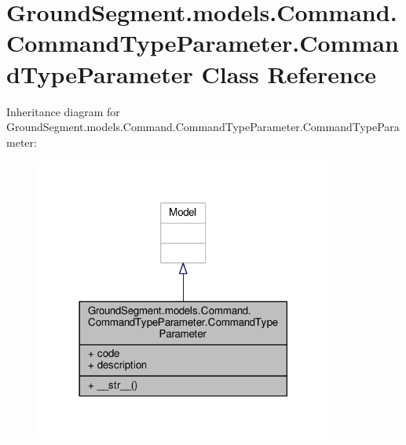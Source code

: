 \hypertarget{class_ground_segment_1_1models_1_1_command_1_1_command_type_parameter_1_1_command_type_parameter}{}\section{Ground\+Segment.\+models.\+Command.\+Command\+Type\+Parameter.\+Command\+Type\+Parameter Class Reference}
\label{class_ground_segment_1_1models_1_1_command_1_1_command_type_parameter_1_1_command_type_parameter}


Inheritance diagram for Ground\+Segment.\+models.\+Command.\+Command\+Type\+Parameter.\+Command\+Type\+Parameter\+:\nopagebreak
\begin{figure}[H]
\begin{center}
\leavevmode
\includegraphics[width=278pt]{class_ground_segment_1_1models_1_1_command_1_1_command_type_parameter_1_1_command_type_parameter__inherit__graph}
\end{center}
\end{figure}


